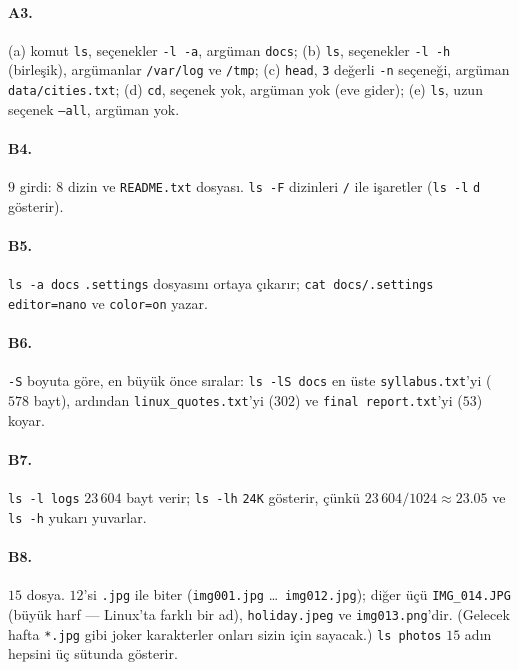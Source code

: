 \documentclass[11pt,a4paper]{article}
\newcommand{\cmd}[1]{\texttt{#1}}
\begin{document}
\paragraph{A3.} (a) komut \cmd{ls}, seçenekler \texttt{-l -a}, argüman \texttt{docs}; (b) \cmd{ls}, seçenekler \texttt{-l -h} (birleşik), argümanlar \texttt{/var/log} ve \texttt{/tmp}; (c) \cmd{head}, \texttt{3} değerli \texttt{-n} seçeneği, argüman \texttt{data/cities.txt}; (d) \cmd{cd}, seçenek yok, argüman yok (eve gider); (e) \cmd{ls}, uzun seçenek \texttt{--all}, argüman yok.

\paragraph{B4.} $9$ girdi: $8$ dizin ve \texttt{README.txt} dosyası. \cmd{ls -F} dizinleri \texttt{/} ile işaretler (\cmd{ls -l} \texttt{d} gösterir).

\paragraph{B5.} \cmd{ls -a docs} \texttt{.settings} dosyasını ortaya çıkarır; \cmd{cat docs/.settings} \texttt{editor=nano} ve \texttt{color=on} yazar.

\paragraph{B6.} \cmd{-S} boyuta göre, en büyük önce sıralar: \cmd{ls -lS docs} en üste \texttt{syllabus.txt}'yi ($578$ bayt), ardından \texttt{linux\_quotes.txt}'yi ($302$) ve \texttt{final report.txt}'yi ($53$) koyar.

\paragraph{B7.} \cmd{ls -l logs} $23\,604$ bayt verir; \cmd{ls -lh} \texttt{24K} gösterir, çünkü $23\,604/1024 \approx 23.05$ ve \cmd{ls -h} yukarı yuvarlar.

\paragraph{B8.} $15$ dosya. $12$'si \texttt{.jpg} ile biter (\texttt{img001.jpg} \ldots\ \texttt{img012.jpg}); diğer üçü \texttt{IMG\_014.JPG} (büyük harf --- Linux'ta farklı bir ad), \texttt{holiday.jpeg} ve \texttt{img013.png}'dir. (Gelecek hafta \texttt{*.jpg} gibi joker karakterler onları sizin için sayacak.) \cmd{ls photos} $15$ adın hepsini üç sütunda gösterir.
\end{document}

